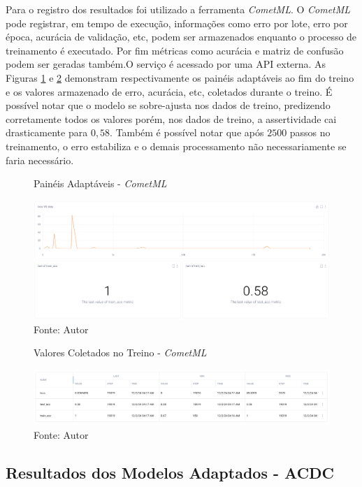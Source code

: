 Para o registro dos resultados foi utilizado a ferramenta \textit{CometML}. O \textit{CometML} pode registrar, em tempo de execução, informações como erro por lote, erro por época, acurácia de validação, etc, podem ser armazenados enquanto o processo de treinamento é executado. Por fim métricas como acurácia e matriz de confusão podem ser geradas também.O serviço é acessado  por uma \gls{API} externa. As Figuras \ref{fig:fig028} e \ref{fig:fig029} demonstram respectivamente os painéis adaptáveis ao fim do treino e os valores armazenado de erro, acurácia, etc, coletados durante o treino. É possível notar que o modelo se sobre-ajusta nos dados de treino, predizendo corretamente todos os valores porém, nos dados de treino,  a assertividade cai drasticamente para $0,58$. Também é possível notar que após $2500$ passos no treinamento, o erro estabiliza e o demais processamento não necessariamente se faria necessário.

\begin{figure}[h!]
    \centering
    \caption{Painéis Adaptáveis - \textit{CometML}}
    \includegraphics[width=1\textwidth]{figures/fig028.png}
    \caption*{Fonte: Autor}
    \label{fig:fig028}
\end{figure}


\begin{figure}[h!]
    \centering
    \caption{Valores Coletados no Treino - \textit{CometML}}
    \includegraphics[width=1\textwidth]{figures/fig029.png}
    \caption*{Fonte: Autor}
    \label{fig:fig029}
\end{figure}


\subsection{Resultados dos Modelos Adaptados - ACDC}
\label{subsec:resultados_acdc_adaptado}

